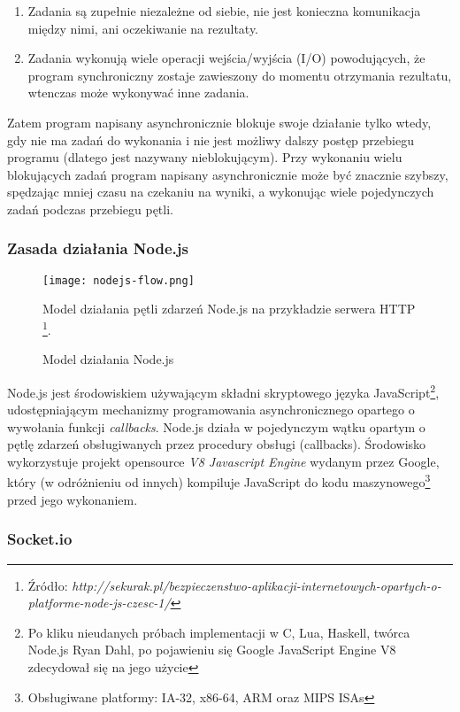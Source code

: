 \begin{enumerate}
  \item Zadania są zupełnie niezależne od siebie, nie jest konieczna komunikacja między nimi, ani oczekiwanie na rezultaty.
  \item Zadania wykonują wiele operacji wejścia/wyjścia (I/O) powodujących, że program synchroniczny zostaje zawieszony do momentu otrzymania rezultatu, wtenczas może wykonywać inne zadania.
\end{enumerate}

Zatem program napisany asynchronicznie blokuje swoje działanie tylko wtedy, gdy nie ma zadań do wykonania i nie jest możliwy dalszy postęp przebiegu programu (dlatego jest nazywany nieblokującym). Przy wykonaniu wielu blokujących zadań program napisany asynchronicznie może być znacznie szybszy, spędzając mniej czasu na czekaniu na wyniki, a wykonując wiele pojedynczych zadań podczas przebiegu pętli.

\subsubsection{Zasada działania Node.js}
\label{sub:tool-server-nodejs}

\begin{figure}[h!]
  \centering
    \texttt{[image: nodejs-flow.png]}
  \caption[Model działania Node.js]{Model działania Node.js}
  Model działania pętli zdarzeń Node.js na przykładzie serwera HTTP \footnote{Źródło: \emph{http://sekurak.pl/bezpieczenstwo-aplikacji-internetowych-opartych-o-platforme-node-js-czesc-1/}}.
\end{figure}

Node.js jest środowiskiem używającym składni skryptowego języka JavaScript\footnote{Po kliku nieudanych próbach implementacji w C, Lua,  Haskell, twórca Node.js Ryan Dahl, po pojawieniu się Google JavaScript Engine V8 zdecydował się na jego użycie}, udostępniającym mechanizmy programowania asynchronicznego opartego o wywołania funkcji \mbox{\emph{callbacks}}. Node.js działa w pojedynczym wątku opartym o pętlę zdarzeń obsługiwanych przez procedury obsługi (callbacks). Środowisko wykorzystuje projekt opensource \emph{V8 Javascript Engine} wydanym przez Google, który (w odróżnieniu od innych) kompiluje JavaScript do kodu maszynowego\footnote{Obsługiwane platformy: IA-32, x86-64, ARM oraz MIPS ISAs} przed jego wykonaniem.

\subsubsection{Socket.io}
\label{subsub:socketio}

